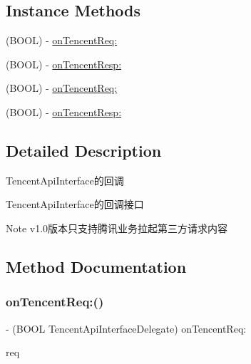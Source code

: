 \subsection*{Instance Methods}
\begin{DoxyCompactItemize}
\item 
(B\+O\+OL) -\/ \mbox{\hyperlink{protocol_tencent_api_interface_delegate_01-p_aa2f2bd65b690d28159f580c38d50f604}{on\+Tencent\+Req\+:}}
\item 
(B\+O\+OL) -\/ \mbox{\hyperlink{protocol_tencent_api_interface_delegate_01-p_adb63249bcfb0ebe8e4e5e6ef777abf29}{on\+Tencent\+Resp\+:}}
\item 
(B\+O\+OL) -\/ \mbox{\hyperlink{protocol_tencent_api_interface_delegate_01-p_aa2f2bd65b690d28159f580c38d50f604}{on\+Tencent\+Req\+:}}
\item 
(B\+O\+OL) -\/ \mbox{\hyperlink{protocol_tencent_api_interface_delegate_01-p_adb63249bcfb0ebe8e4e5e6ef777abf29}{on\+Tencent\+Resp\+:}}
\end{DoxyCompactItemize}


\subsection{Detailed Description}
Tencent\+Api\+Interface的回调 

Tencent\+Api\+Interface的回调接口 \begin{DoxyNote}{Note}
v1.\+0版本只支持腾讯业务拉起第三方请求内容 
\end{DoxyNote}


\subsection{Method Documentation}
\mbox{\label{protocol_tencent_api_interface_delegate_01-p_aa2f2bd65b690d28159f580c38d50f604}} 
\subsubsection{\texorpdfstring{on\+Tencent\+Req\+:()}{onTencentReq:()}\hspace{0.1cm}{\footnotesize\ttfamily [1/2]}}
{\footnotesize\ttfamily -\/ (B\+O\+OL Tencent\+Api\+Interface\+Delegate) on\+Tencent\+Req\+: \begin{DoxyParamCaption}\item[{(\mbox{\hyperlink{interface_tencent_api_req}{Tencent\+Api\+Req}} $\ast$)}]{req }\end{DoxyParamCaption}\hspace{0.3cm}{\ttfamily [optional]}}

